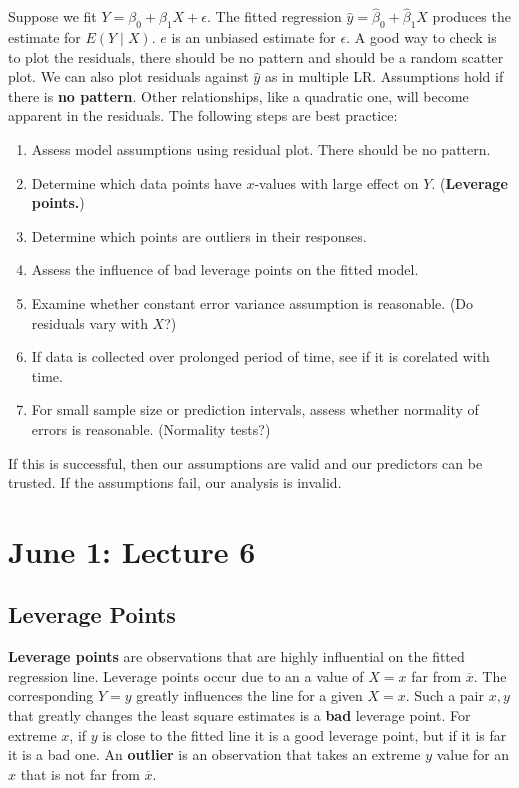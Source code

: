 \documentclass[12pt, a4paper]{article}
\theoremstyle{definition}
\newcommand{\eps}{\epsilon}
\newcommand{\ol}{\overline}
\begin{document}
		Suppose we fit $Y = \beta_0 + \beta_1 X + \eps$. The fitted regression $\hat y = \hat \beta_0 + \hat \beta_1 X$ produces the estimate for $E(Y \mid X)$. $e$ is an unbiased estimate for $\eps$. A good way to check is to plot the residuals, there should be no pattern and should be a random scatter plot. We can also plot residuals against $\hat y$ as in multiple LR. Assumptions hold if there is {\bf no pattern}. Other relationships, like a quadratic one, will become apparent in the residuals. The following steps are best practice:
		\begin{enumerate}
			\item Assess model assumptions using residual plot. There should be no pattern.
			\item Determine which data points have $x$-values with large effect on $Y$. ({\bf Leverage points.})
			\item Determine which points are outliers in their responses.
			\item Assess the influence of bad leverage points on the fitted model.
			\item Examine whether constant error variance assumption is reasonable. (Do residuals vary with $X$?)
			\item If data is collected over prolonged period of time, see if it is corelated with time.
			\item For small sample size or prediction intervals, assess whether normality of errors is reasonable. (Normality tests?)
		\end{enumerate}
	
	 If this is successful, then our assumptions are valid and our predictors can be trusted. If the assumptions fail, our analysis is invalid.
		
	\section{June 1: Lecture 6}
	
	\subsection{Leverage Points}
	
	{\bf Leverage points} are observations that are highly influential on the fitted regression line. Leverage points occur due to an a value of $X=x$ far from $\ol x$. The corresponding $Y=y$ greatly influences the line for a given $X=x$. Such a pair $x,y$ that greatly changes the least square estimates is a {\bf bad} leverage point. For extreme $x$, if $y$ is close to the fitted line it is a good leverage point, but if it is far it is a bad one. An {\bf outlier} is an observation that takes an extreme $y$ value for an $x$ that is not far from $\ol x$. 
	
\end{document}
